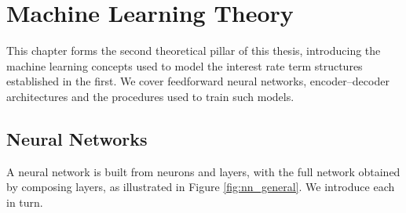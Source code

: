 \chapter{Machine Learning Theory}
\label{chap:ml_theory}

This chapter forms the second theoretical pillar of this thesis, introducing the machine learning concepts used to model the interest rate term structures established in the first. We cover feedforward neural networks, encoder--decoder architectures and the procedures used to train such models.



\section{Neural Networks}
\label{sec:neural_networks}


A neural network is built from neurons and layers, with the full network obtained by composing layers, as illustrated in Figure \ref{fig:nn_general}. We introduce each in turn.





